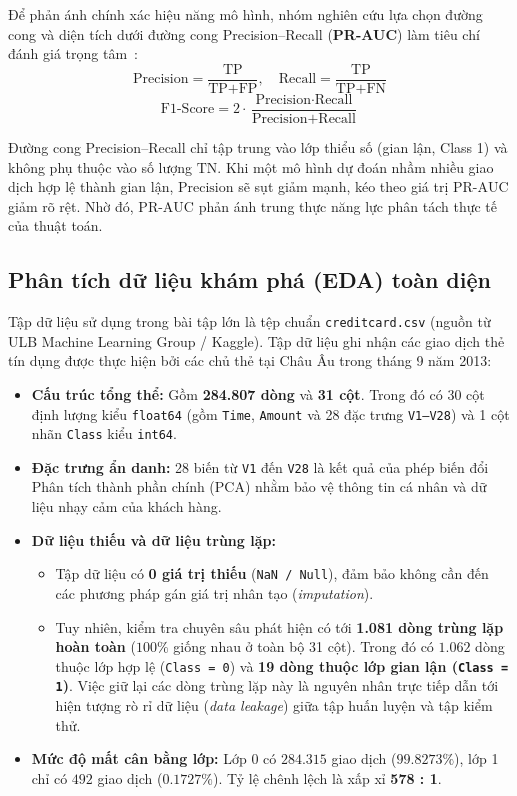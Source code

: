 \documentclass[13pt,a4paper]{extarticle}
\begin{document}
Để phản ánh chính xác hiệu năng mô hình, nhóm nghiên cứu lựa chọn đường cong và diện tích dưới đường cong Precision--Recall (\textbf{PR-AUC}) làm tiêu chí đánh giá trọng tâm~\cite{saito2015precision,davis2006relationship}:
\begin{equation}
\text{Precision} = \frac{\text{TP}}{\text{TP} + \text{FP}}, \quad \text{Recall} = \frac{\text{TP}}{\text{TP} + \text{FN}}
\end{equation}
\begin{equation}
\text{F1-Score} = 2 \cdot \frac{\text{Precision} \cdot \text{Recall}}{\text{Precision} + \text{Recall}}
\end{equation}

Đường cong Precision--Recall chỉ tập trung vào lớp thiểu số (gian lận, Class 1) và không phụ thuộc vào số lượng $\text{TN}$. Khi một mô hình dự đoán nhầm nhiều giao dịch hợp lệ thành gian lận, $\text{Precision}$ sẽ sụt giảm mạnh, kéo theo giá trị $\text{PR-AUC}$ giảm rõ rệt. Nhờ đó, $\text{PR-AUC}$ phản ánh trung thực năng lực phân tách thực tế của thuật toán.

\subsection{Phân tích dữ liệu khám phá (EDA) toàn diện}
Tập dữ liệu sử dụng trong bài tập lớn là tệp chuẩn \texttt{creditcard.csv} (nguồn từ ULB Machine Learning Group / Kaggle). Tập dữ liệu ghi nhận các giao dịch thẻ tín dụng được thực hiện bởi các chủ thẻ tại Châu Âu trong tháng 9 năm 2013:
\begin{itemize}
    \item \textbf{Cấu trúc tổng thể:} Gồm \textbf{284.807 dòng} và \textbf{31 cột}. Trong đó có 30 cột định lượng kiểu \texttt{float64} (gồm \texttt{Time}, \texttt{Amount} và 28 đặc trưng \texttt{V1--V28}) và 1 cột nhãn \texttt{Class} kiểu \texttt{int64}.
    \item \textbf{Đặc trưng ẩn danh:} 28 biến từ \texttt{V1} đến \texttt{V28} là kết quả của phép biến đổi Phân tích thành phần chính (PCA) nhằm bảo vệ thông tin cá nhân và dữ liệu nhạy cảm của khách hàng.
    \item \textbf{Dữ liệu thiếu và dữ liệu trùng lặp:}
    \begin{itemize}
        \item Tập dữ liệu có \textbf{0 giá trị thiếu} (\texttt{NaN / Null}), đảm bảo không cần đến các phương pháp gán giá trị nhân tạo (\textit{imputation}).
        \item Tuy nhiên, kiểm tra chuyên sâu phát hiện có tới \textbf{1.081 dòng trùng lặp hoàn toàn} ($100\%$ giống nhau ở toàn bộ 31 cột). Trong đó có $1.062$ dòng thuộc lớp hợp lệ (\texttt{Class = 0}) và \textbf{19 dòng thuộc lớp gian lận (\texttt{Class = 1})}. Việc giữ lại các dòng trùng lặp này là nguyên nhân trực tiếp dẫn tới hiện tượng rò rỉ dữ liệu (\textit{data leakage}) giữa tập huấn luyện và tập kiểm thử.
    \end{itemize}
    \item \textbf{Mức độ mất cân bằng lớp:} Lớp 0 có $284.315$ giao dịch ($99.8273\%$), lớp 1 chỉ có $492$ giao dịch ($0.1727\%$). Tỷ lệ chênh lệch là xấp xỉ \textbf{578 : 1}.
\end{itemize}
\end{document}
